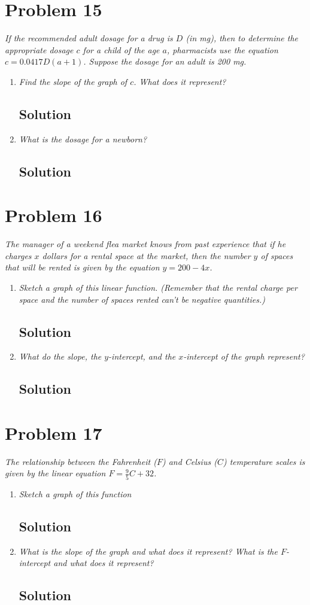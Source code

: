 \documentclass[11pt]{article}
\newcommand{\soln}{\subsection*}
\newcommand{\qn}{\textit}
\begin{document}
\section*{Problem 15}

\qn{If the recommended adult dosage for a drug is $D$ (in mg), then to determine the appropriate dosage $c$ for a child of the age $a$, pharmacists use the equation $c=0.0417D(a+1)$. Suppose the dosage for an adult is 200 mg.}

\begin{enumerate}
	\item \qn{Find the slope of the graph of $c$. What does it represent?}
	\soln{Solution}
	
	\item \qn{What is the dosage for a newborn?}
	\soln{Solution}
\end{enumerate}

\section*{Problem 16}

\qn{The manager of a weekend flea market knows from past experience that if he charges $x$ dollars for a rental space at the market, then the number $y$ of spaces that will be rented is given by the equation $y=200-4x$.}

\begin{enumerate}
	\item \qn{Sketch a graph of this linear function. (Remember that the rental charge per space and the number of spaces rented can't be negative quantities.)}
	\soln{Solution}
	
	\item \qn{What do the slope, the $y$-intercept, and the $x$-intercept of the graph represent?}
	\soln{Solution}
\end{enumerate}

\section*{Problem 17}

\qn{The relationship between the Fahrenheit ($F$) and Celsius ($C$) temperature scales is given by the linear equation $F=\frac{9}{5}C+32$.}

\begin{enumerate}
	\item \qn{Sketch a graph of this function}
	\soln{Solution}
	
	\item \qn{What is the slope of the graph and what does it represent? What is the $F$-intercept and what does it represent?}
	\soln{Solution}
\end{enumerate}
\end{document}
